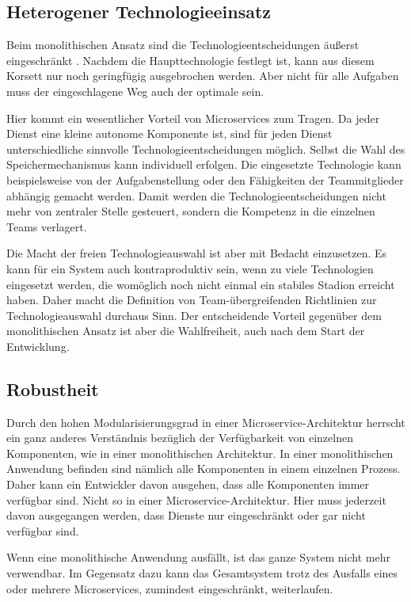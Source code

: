 \subsection{Heterogener Technologieeinsatz}

Beim monolithischen Ansatz sind die Technologieentscheidungen äußerst eingeschränkt \cite{fowlerMSTradeOffs}. Nachdem die Haupttechnologie festlegt ist, kann aus diesem Korsett nur noch geringfügig ausgebrochen werden. Aber nicht für alle Aufgaben muss der eingeschlagene Weg auch der optimale sein.

Hier kommt ein wesentlicher Vorteil von Microservices zum Tragen. Da jeder Dienst eine kleine autonome Komponente ist, sind für jeden Dienst unterschiedliche sinnvolle Technologieentscheidungen möglich. Selbst die Wahl des Speichermechanismus kann individuell erfolgen. Die eingesetzte Technologie kann beispielsweise von der Aufgabenstellung oder den Fähigkeiten der Teammitglieder abhängig gemacht werden. Damit werden die Technologieentscheidungen nicht mehr von zentraler Stelle gesteuert, sondern die Kompetenz in die einzelnen Teams verlagert.

Die Macht der freien Technologieauswahl ist aber mit Bedacht einzusetzen. Es kann für ein System auch kontraproduktiv sein, wenn zu viele Technologien eingesetzt werden, die womöglich noch nicht einmal ein stabiles Stadion erreicht haben. Daher macht die Definition von Team-übergreifenden Richtlinien zur Technologieauswahl durchaus Sinn. Der entscheidende Vorteil gegenüber dem monolithischen Ansatz ist aber die Wahlfreiheit, auch nach dem Start der Entwicklung.

\subsection{Robustheit}

Durch den hohen Modularisierungsgrad in einer Microservice-Architektur herrscht ein ganz anderes Verständnis bezüglich der Verfügbarkeit von einzelnen Komponenten, wie in einer monolithischen Architektur. In einer monolithischen Anwendung befinden sind nämlich alle Komponenten in einem einzelnen Prozess. Daher kann ein Entwickler davon ausgehen, dass alle Komponenten immer verfügbar sind. Nicht so in einer Microservice-Architektur. Hier muss jederzeit davon ausgegangen werden, dass Dienste nur eingeschränkt oder gar nicht verfügbar sind.

Wenn eine monolithische Anwendung ausfällt, ist das ganze System nicht mehr verwendbar. Im Gegensatz dazu kann das Gesamtsystem trotz des Ausfalls eines oder mehrere Microservices, zumindest eingeschränkt, weiterlaufen.

